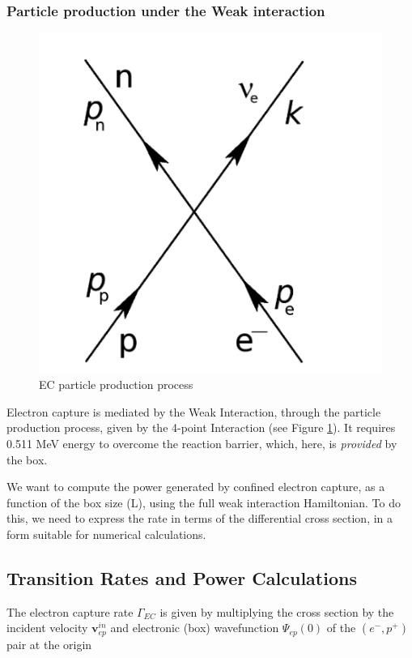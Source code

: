 \documentclass[11pt]{amsart}
\begin{document}
\subsubsection{Particle production under the Weak interaction}

\begin{figure}
   \includegraphics[scale=0.25]{img/feynman.png}
   \caption{EC particle production process}
  \label{fig:ppp}
\end{figure}

Electron capture is mediated by the Weak Interaction, through the particle production process, given by the 4-point Interaction (see Figure \ref{fig:ppp}).   It requires 0.511 MeV energy to overcome the reaction barrier, which, here, is \emph{provided} by the box. \

We want to compute the power generated by confined electron capture, as a function of the box size (L), using the full weak interaction Hamiltonian.  To do this, we need to express the rate in terms of the differential cross section, in a form suitable for numerical calculations.  

\subsection{Transition Rates and Power Calculations}

The electron capture rate $\Gamma_{EC}$  is given by multiplying the cross section by the incident velocity $\mathbf{v}^{in}_{ep}$ and electronic (box) wavefunction  $\Psi_{ep}(0)$  of the $(e^{-},p^{+})$ pair at the origin
\end{document}
